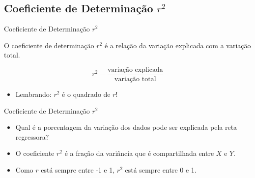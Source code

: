 \documentclass{beamer}
\begin{document}


\subsection[$R^2$]{Coeficiente de Determinação $r^2$}

\begin{frame}{Coeficiente de Determinação $r^2$}
  \begin{definition}
    O \alert{coeficiente de determinação} $r^2$ é a relação da
    variação explicada com a variação total.
  \end{definition}
  \begin{displaymath}
    r^2 = \frac{\text{variação explicada}}{\text{variação total}}
  \end{displaymath}
  \begin{itemize}
  \item Lembrando: $r^2$ é o quadrado de $r$!
  \end{itemize}
\end{frame}

\begin{frame}{Coeficiente de Determinação $r^2$}
  \begin{itemize}
  \item Qual é a porcentagem da variação dos dados pode ser explicada
    pela reta regressora?
  \item O coeficiente $r^2$ é a fração da variância que é
    compartilhada entre $X$ e $Y$.
  \item Como $r$ está sempre entre -1 e 1, $r^2$ está sempre entre 0 e
    1.
  \end{itemize}
\end{frame}
\end{document}
